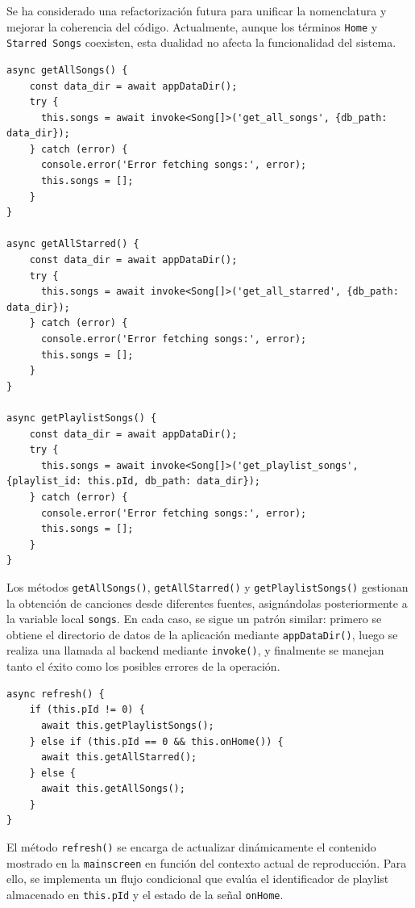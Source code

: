 \documentclass[11pt, a4paper]{article}
\begin{document}
                Se ha considerado una refactorización futura para unificar la nomenclatura y mejorar la coherencia del código. Actualmente, aunque los términos \texttt{Home} y \texttt{Starred Songs} coexisten, esta dualidad no afecta la funcionalidad del sistema. \\

                \begin{lstlisting}[caption={Obtención de playlists}]
async getAllSongs() {
    const data_dir = await appDataDir();
    try {
      this.songs = await invoke<Song[]>('get_all_songs', {db_path: data_dir});
    } catch (error) {
      console.error('Error fetching songs:', error);
      this.songs = [];
    }
}

async getAllStarred() {
    const data_dir = await appDataDir();
    try {
      this.songs = await invoke<Song[]>('get_all_starred', {db_path: data_dir});
    } catch (error) {
      console.error('Error fetching songs:', error);
      this.songs = [];
    }
}

async getPlaylistSongs() {
    const data_dir = await appDataDir();
    try {
      this.songs = await invoke<Song[]>('get_playlist_songs', {playlist_id: this.pId, db_path: data_dir});
    } catch (error) {
      console.error('Error fetching songs:', error);
      this.songs = [];
    }
}
                \end{lstlisting}

                Los métodos \texttt{getAllSongs()}, \texttt{getAllStarred()} y \texttt{getPlaylistSongs()} gestionan la obtención de canciones desde diferentes fuentes, asignándolas posteriormente a la variable local \texttt{songs}. En cada caso, se sigue un patrón similar: primero se obtiene el directorio de datos de la aplicación mediante \texttt{appDataDir()}, luego se realiza una llamada al backend mediante \texttt{invoke()}, y finalmente se manejan tanto el éxito como los posibles errores de la operación. \\

                \begin{lstlisting}[caption={refresh()}]
async refresh() {
    if (this.pId != 0) {
      await this.getPlaylistSongs();
    } else if (this.pId == 0 && this.onHome()) {
      await this.getAllStarred();
    } else {
      await this.getAllSongs();
    }
}
                \end{lstlisting}

                El método \texttt{refresh()} se encarga de actualizar dinámicamente el contenido mostrado en la \texttt{mainscreen} en función del contexto actual de reproducción. Para ello, se implementa un flujo condicional que evalúa el identificador de playlist almacenado en \texttt{this.pId} y el estado de la señal \texttt{onHome}. \\
\end{document}
